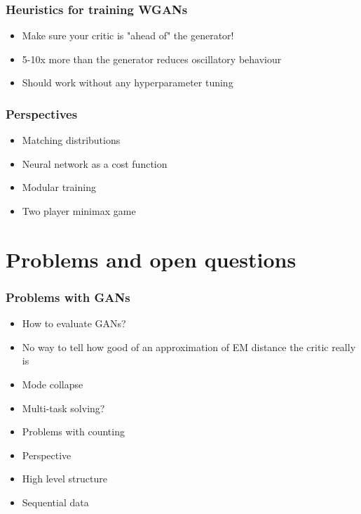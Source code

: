 \documentclass{Bredelebeamer}
\begin{document}
\begin{frame}
\frametitle{Heuristics for training WGANs}
\begin{itemize}
	\item Make sure your critic is "ahead of" the generator!
	\item 5-10x more than the generator reduces oscillatory behaviour
	\item Should work without any hyperparameter tuning
\end{itemize}
\end{frame}
\begin{frame}
\frametitle{Perspectives}
\begin{itemize}
	\item Matching distributions
	\item Neural network as a cost function
	\item Modular training
	\item Two player minimax game
\end{itemize}
\end{frame}


\section{Problems and open questions}
\begin{frame}
	\frametitle{Problems with GANs}
	\begin{itemize}[<+->]
		\item How to evaluate GANs?
		\item No way to tell how good of an approximation of EM distance the critic really is
		\item Mode collapse
		\item Multi-task solving?
		\item Problems with counting
		\item Perspective
		\item High level structure
		\item Sequential data
	\end{itemize}
\end{frame}
\end{document}
